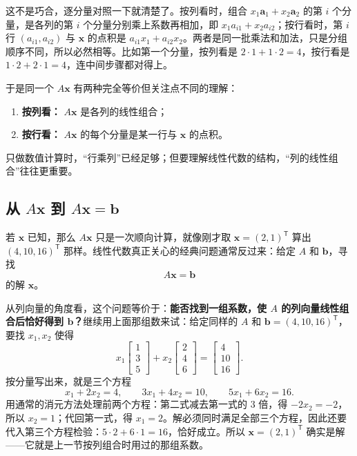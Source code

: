 \documentclass[UTF8,a4paper,12pt]{ctexart}
\numberwithin{equation}{section}
\newcommand{\trans}{^{\mathsf T}}
\begin{document}
	这不是巧合，逐分量对照一下就清楚了。按列看时，组合 $x_1\bm{a}_1+x_2\bm{a}_2$ 的第 $i$ 个分量，是各列的第 $i$ 个分量分别乘上系数再相加，即 $x_1a_{i1}+x_2a_{i2}$；按行看时，第 $i$ 行 $(a_{i1},a_{i2})$ 与 $\bm{x}$ 的点积是 $a_{i1}x_1+a_{i2}x_2$。两者是同一批乘法和加法，只是分组顺序不同，所以必然相等。比如第一个分量，按列看是 $2\cdot1+1\cdot2=4$，按行看是 $1\cdot2+2\cdot1=4$，连中间步骤都对得上。
	
	于是同一个 $A\bm{x}$ 有两种完全等价但关注点不同的理解：
	\begin{enumerate}
		\item \textbf{按列看：} $A\bm{x}$ 是各列的线性组合；
		\item \textbf{按行看：} $A\bm{x}$ 的每个分量是某一行与 $\bm{x}$ 的点积。
	\end{enumerate}
	只做数值计算时，“行乘列”已经足够；但要理解线性代数的结构，“列的线性组合”往往更重要。
	
	\subsection{从 \texorpdfstring{$A\bm{x}$}{Ax} 到 \texorpdfstring{$A\bm{x}=\bm{b}$}{Ax=b}}
	
	若 $\bm{x}$ 已知，那么 $A\bm{x}$ 只是一次顺向计算，就像刚才取 $\bm{x}=(2,1)\trans$ 算出 $(4,10,16)\trans$ 那样。线性代数真正关心的经典问题通常反过来：给定 $A$ 和 $\bm{b}$，寻找
	\begin{equation}\label{eq:3.17}
	A\bm{x}=\bm{b}
	\end{equation}
	的解 $\bm{x}$。
	
	从列向量的角度看，这个问题等价于：\textbf{能否找到一组系数，使 $A$ 的列向量线性组合后恰好得到 $\bm{b}$？}继续用上面那组数来试：给定同样的 $A$ 和 $\bm{b}=(4,10,16)\trans$，要找 $x_1,x_2$ 使得
	\begin{equation}\label{eq:3.18}
	x_1
	\begin{bmatrix}
		1\\3\\5
	\end{bmatrix}
	+x_2
	\begin{bmatrix}
		2\\4\\6
	\end{bmatrix}
	=
	\begin{bmatrix}
		4\\10\\16
	\end{bmatrix}.
	\end{equation}
	按分量写出来，就是三个方程
	\begin{equation}\label{eq:3.19}
	x_1+2x_2=4,
	\qquad
	3x_1+4x_2=10,
	\qquad
	5x_1+6x_2=16.
	\end{equation}
	用通常的消元方法处理前两个方程：第二式减去第一式的 $3$ 倍，得 $-2x_2=-2$，所以 $x_2=1$；代回第一式，得 $x_1=2$。解必须同时满足全部三个方程，因此还要代入第三个方程检验：$5\cdot2+6\cdot1=16$，恰好成立。所以 $\bm{x}=(2,1)\trans$ 确实是解——它就是上一节按列组合时用过的那组系数。
	
\end{document}
